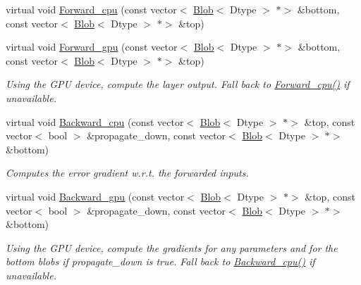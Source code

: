 \begin{DoxyCompactItemize}
virtual void \mbox{\hyperlink{classcaffe_1_1_filter_layer_a338878561cb163fc35eea6840c20f9f3}{Forward\+\_\+cpu}} (const vector$<$ \mbox{\hyperlink{classcaffe_1_1_blob}{Blob}}$<$ Dtype $>$ $\ast$$>$ \&bottom, const vector$<$ \mbox{\hyperlink{classcaffe_1_1_blob}{Blob}}$<$ Dtype $>$ $\ast$$>$ \&top)
\item 
\mbox{\label{classcaffe_1_1_filter_layer_ae533ee2002b14016ee57daf7a9f6e8d6}} 
virtual void \mbox{\hyperlink{classcaffe_1_1_filter_layer_ae533ee2002b14016ee57daf7a9f6e8d6}{Forward\+\_\+gpu}} (const vector$<$ \mbox{\hyperlink{classcaffe_1_1_blob}{Blob}}$<$ Dtype $>$ $\ast$$>$ \&bottom, const vector$<$ \mbox{\hyperlink{classcaffe_1_1_blob}{Blob}}$<$ Dtype $>$ $\ast$$>$ \&top)
\begin{DoxyCompactList}\small\item\em Using the G\+PU device, compute the layer output. Fall back to \mbox{\hyperlink{classcaffe_1_1_filter_layer_a67a110cc4062500dcfdb539e3ba9154b}{Forward\+\_\+cpu()}} if unavailable. \end{DoxyCompactList}\item 
virtual void \mbox{\hyperlink{classcaffe_1_1_filter_layer_a368dfe80f0fd477d4cf6d8bcf1d0c73d}{Backward\+\_\+cpu}} (const vector$<$ \mbox{\hyperlink{classcaffe_1_1_blob}{Blob}}$<$ Dtype $>$ $\ast$$>$ \&top, const vector$<$ bool $>$ \&propagate\+\_\+down, const vector$<$ \mbox{\hyperlink{classcaffe_1_1_blob}{Blob}}$<$ Dtype $>$ $\ast$$>$ \&bottom)
\begin{DoxyCompactList}\small\item\em Computes the error gradient w.\+r.\+t. the forwarded inputs. \end{DoxyCompactList}\item 
\mbox{\label{classcaffe_1_1_filter_layer_a3114666280a8c406779753525c4846c7}} 
virtual void \mbox{\hyperlink{classcaffe_1_1_filter_layer_a3114666280a8c406779753525c4846c7}{Backward\+\_\+gpu}} (const vector$<$ \mbox{\hyperlink{classcaffe_1_1_blob}{Blob}}$<$ Dtype $>$ $\ast$$>$ \&top, const vector$<$ bool $>$ \&propagate\+\_\+down, const vector$<$ \mbox{\hyperlink{classcaffe_1_1_blob}{Blob}}$<$ Dtype $>$ $\ast$$>$ \&bottom)
\begin{DoxyCompactList}\small\item\em Using the G\+PU device, compute the gradients for any parameters and for the bottom blobs if propagate\+\_\+down is true. Fall back to \mbox{\hyperlink{classcaffe_1_1_filter_layer_a11e002d2b3294ca185a01c007995711d}{Backward\+\_\+cpu()}} if unavailable. \end{DoxyCompactList}\end{DoxyCompactItemize}
